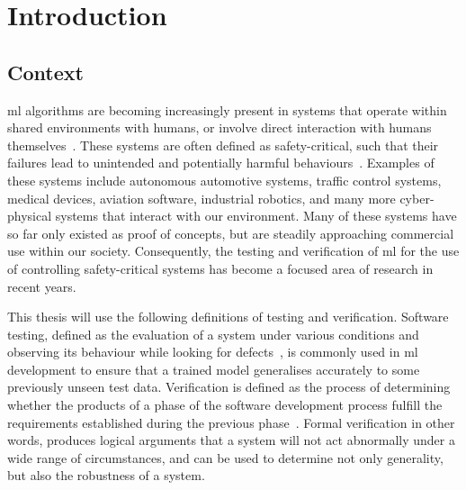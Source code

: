 
\chapter{Introduction} %
\label{Chapter1} %



\section{Context}

\Gls{ml} algorithms are becoming increasingly present in systems that operate within shared environments
with humans, or involve direct interaction with humans themselves~\citep{pereira}. These systems 
are often defined as safety-critical, such that their failures lead to unintended and potentially harmful behaviours~\citep{amodei}.
Examples of these systems include autonomous automotive systems, traffic control systems, medical devices, aviation software,
industrial robotics, and many more cyber-physical systems that interact with our environment.
Many of these systems have so far only existed as proof of concepts, but are steadily approaching commercial use within our society.
Consequently, the testing and verification of \gls{ml} for the use of controlling safety-critical systems has become a focused area of research in recent years.

This thesis will use the following definitions of testing and verification.
Software testing, defined as the evaluation of a system under various conditions and observing its behaviour while looking for defects~\citep{pereira}, is
commonly used in \gls{ml} development to ensure that a trained model generalises accurately to some previously unseen test data.
Verification is defined as the process of determining whether the products of a phase of the software development process fulfill
the requirements established during the previous phase~\citep{ammann2008}. Formal verification in other words, produces logical arguments
that a system will not act abnormally under a wide range of circumstances, and can be used to determine not only generality, but also the robustness of a system.

